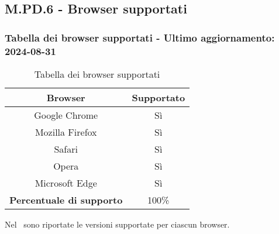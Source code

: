 \subsection{M.PD.6 - Browser supportati}

\subsubsection*{Tabella dei browser supportati - Ultimo aggiornamento: 2024-08-31}

\begin{table}[H]
  \centering
  \begin{tabular}{|c|c|}
      \hline
      \textbf{Browser} & \textbf{Supportato} \\
      \hline
      Google Chrome & Sì \\
      \hline
      Mozilla Firefox & Sì \\
      \hline
      Safari & Sì \\
      \hline
      Opera & Sì \\
      \hline
      Microsoft Edge & Sì \\
      \hline
      \textbf{Percentuale di supporto} & 100\% \\
      \hline 
  \end{tabular}
  \caption{Tabella dei browser supportati}
\end{table}

\par Nel \MU\ sono riportate le versioni supportate per ciascun browser.